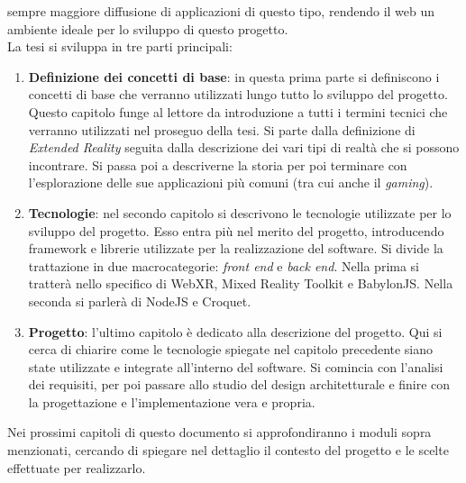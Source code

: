 sempre maggiore diffusione di applicazioni di questo tipo, rendendo il web un ambiente ideale per lo sviluppo di questo progetto.\\
\newline
La tesi si sviluppa in tre parti principali:
\begin{enumerate}
    \item \textbf{Definizione dei concetti di base}: in questa prima parte si definiscono i concetti di base che verranno utilizzati lungo tutto lo sviluppo del progetto. Questo 
    capitolo funge al lettore da introduzione a tutti i termini tecnici che verranno utilizzati nel proseguo della tesi. Si parte dalla definizione di \textit{Extended Reality} seguita
    dalla descrizione dei vari tipi di realtà che si possono incontrare. Si passa poi a descriverne la storia per poi terminare con l'esplorazione delle sue applicazioni
    più comuni (tra cui anche il \textit{gaming}).
    \item \textbf{Tecnologie}: nel secondo capitolo si descrivono le tecnologie utilizzate per lo sviluppo del progetto. Esso entra più nel merito del progetto, 
    introducendo framework e librerie utilizzate per la realizzazione del software. Si divide la trattazione in due macrocategorie: \textit{front end} e \textit{back end}. Nella prima
    si tratterà nello specifico di WebXR, Mixed Reality Toolkit e BabylonJS. Nella seconda si parlerà di NodeJS e Croquet.
    \item \textbf{Progetto}: l'ultimo capitolo è dedicato alla descrizione del progetto. Qui si cerca di chiarire come le tecnologie spiegate nel capitolo precedente siano state
    utilizzate e integrate all'interno del software. Si comincia con l'analisi dei requisiti, per poi passare allo studio del design architetturale e finire con la progettazione e
    l'implementazione vera e propria.
\end{enumerate}
Nei prossimi capitoli di questo documento si approfondiranno i moduli sopra menzionati, cercando di spiegare nel dettaglio il contesto del progetto e le scelte effettuate per
realizzarlo. 